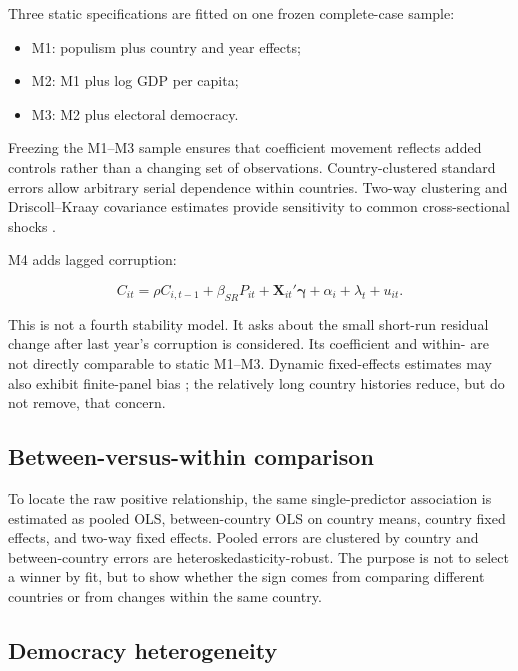 Three static specifications are fitted on one frozen complete-case sample:

\begin{itemize}
  \item M1: populism plus country and year effects;
  \item M2: M1 plus log GDP per capita;
  \item M3: M2 plus electoral democracy.
\end{itemize}

Freezing the M1--M3 sample ensures that coefficient movement reflects added controls rather than a
changing set of observations. Country-clustered standard errors allow arbitrary serial dependence
within countries. Two-way clustering and Driscoll--Kraay covariance estimates provide sensitivity to
common cross-sectional shocks \citep{driscoll1998}.

M4 adds lagged corruption:

\begin{equation}
  C_{it} = \rho C_{i,t-1} + \beta_{SR} P_{it}
  + \mathbf{X}_{it}'\boldsymbol{\gamma} + \alpha_i + \lambda_t + u_{it}.
  \label{eq:dynamic}
\end{equation}

This is not a fourth stability model. It asks about the small short-run residual change after last
year's corruption is considered. Its coefficient and within-
\Rtwo{} are not directly comparable to static M1--M3. Dynamic fixed-effects estimates may also exhibit
finite-panel bias \citep{nickell1981}; the relatively long country histories reduce, but do not remove,
that concern.

\subsection{Between-versus-within comparison}

To locate the raw positive relationship, the same single-predictor association is estimated as pooled
OLS, between-country OLS on country means, country fixed effects, and two-way fixed effects. Pooled
errors are clustered by country and between-country errors are heteroskedasticity-robust. The purpose
is not to select a winner by fit, but to show whether the sign comes from comparing different countries
or from changes within the same country.

\subsection{Democracy heterogeneity}

